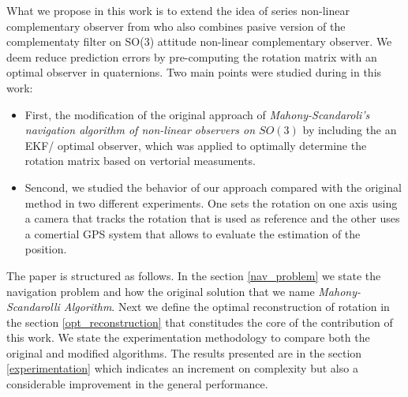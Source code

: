 \documentclass[conference]{IEEEtran}
\begin{document}
What we propose in this work is to extend the idea of series non-linear complementary observer from \cite{Scandaro2011} who also combines pasive version of the complementaty filter on SO(3) \cite{Mahony2008} attitude non-linear complementary observer. We deem reduce prediction errors by pre-computing the rotation matrix with an optimal observer in quaternions. Two main points were studied during in this work:
\begin{itemize}
\item First, the modification of the original approach of \emph{Mahony-Scandaroli's navigation algorithm of non-linear observers on $SO(3)$} \cite{Mahony2008,Scandaro2011} by including the an EKF/ optimal observer, which was applied to optimally determine the rotation matrix based on vertorial measuments.
\item Sencond, we studied the behavior of our approach compared with the original method in two different experiments. One sets the rotation on one axis using a camera that tracks the rotation that is used as reference and the other uses a comertial GPS system that allows to evaluate the estimation of the position. \end{itemize}\par
The paper is structured as follows. In the section \ref{nav_problem} we state the navigation problem and how the original solution that we name \emph{Mahony-Scandarolli Algorithm}. Next we define the optimal reconstruction of rotation in the section \ref{opt_reconstruction} that constitudes the core of the contribution of this work. We state the experimentation methodology to compare both the original and modified algorithms. The results presented are in the section \ref{experimentation} which indicates an increment on complexity but also a considerable improvement in the general performance. 
\end{document}
